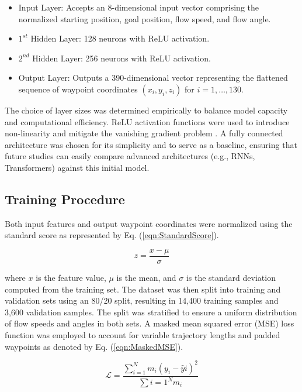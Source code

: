 \documentclass[final,5p,times,twocolumn]{elsarticle}
\begin{document}
\begin{itemize}[itemsep=0.3em] %
    \item Input Layer: Accepts an 8-dimensional input vector comprising the normalized starting position, goal position, flow speed, and flow angle.
    \item $1^{st}$ Hidden Layer: 128 neurons with ReLU activation.
    \item $2^{nd}$ Hidden Layer: 256 neurons with ReLU activation.
    \item Output Layer: Outputs a 390-dimensional vector representing the flattened sequence of waypoint coordinates $(x_i, y_i, z_i)$ for $i = 1, \dots, 130$.
\end{itemize}

The choice of layer sizes was determined empirically to balance model capacity and computational efficiency. ReLU activation functions were used to introduce non-linearity and mitigate the vanishing gradient problem \cite{Glorot2011}. A fully connected architecture was chosen for its simplicity and to serve as a baseline, ensuring that future studies can easily compare advanced architectures (e.g., RNNs, Transformers) against this initial model.

\subsection{Training Procedure}

Both input features and output waypoint coordinates were normalized using the standard score as represented by Eq. (\ref{eqn:StandardScore}).

\begin{equation} 
    \label{eqn:StandardScore}
    z = \frac{x - \mu}{\sigma} 
\end{equation}

\noindent where $x$ is the feature value, $\mu$ is the mean, and $\sigma$ is the standard deviation computed from the training set. The dataset was then split into training and validation sets using an 80/20 split, resulting in 14,400 training samples and 3,600 validation samples. The split was stratified to ensure a uniform distribution of flow speeds and angles in both sets. A masked mean squared error (MSE) loss function was employed to account for variable trajectory lengths and padded waypoints as denoted by Eq. (\ref{eqn:MaskedMSE}).

\begin{equation} 
    \label{eqn:MaskedMSE}
    \mathcal{L} = \frac{\sum_{i=1}^{N} m_i (y_i - \hat{y}i)^2}{\sum{i=1}^{N} m_i} 
\end{equation}
\end{document}
